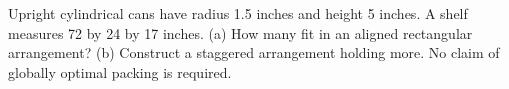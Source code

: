 Upright cylindrical cans have radius 1.5 inches and height 5 inches. A shelf measures 72 by 24 by 17 inches. (a) How many fit in an aligned rectangular arrangement? (b) Construct a staggered arrangement holding more. No claim of globally optimal packing is required.
